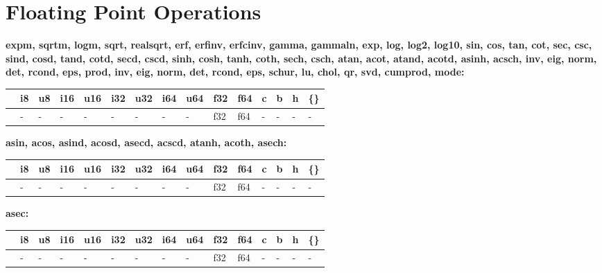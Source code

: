 \section{Floating Point Operations}
\textbf{expm, sqrtm, logm, sqrt, realsqrt, erf, erfinv, erfcinv, gamma, gammaln, exp, log, log2, log10, sin, cos, tan, cot, sec, csc, sind, cosd, tand, cotd, secd, cscd, sinh, cosh, tanh, coth, sech, csch, atan, acot, atand, acotd, asinh, acsch, inv, eig, norm, det, rcond, eps, prod, inv, eig, norm, det, rcond, eps, schur, lu, chol, qr, svd, cumprod, mode:}
\begin{scriptsize}\begin{tt}\begin{center}\vspace{-.3cm}\begin{tabular}{|m{.65cm}||m{.65cm}|m{.65cm}|m{.65cm}|m{.65cm}|m{.65cm}|m{.65cm}|m{.65cm}|m{.65cm}|m{.65cm}|m{.65cm}|m{.65cm}|m{.65cm}|m{.65cm}|m{.65cm}|}\hline 
&i8&u8&i16&u16&i32&u32&i64&u64&f32&f64&c&b&h&\{\}\\ \hline \hline
&-&-&-&-&-&-&-&-&f32&f64&-&-&-&-\\ \hline
\end{tabular}\end{center}\end{tt}\end{scriptsize} 

\textbf{asin, acos, asind, acosd, asecd, acscd, atanh, acoth, asech:}
\begin{scriptsize}\begin{tt}\begin{center}\vspace{-.3cm}\begin{tabular}{|m{.65cm}||m{.65cm}|m{.65cm}|m{.65cm}|m{.65cm}|m{.65cm}|m{.65cm}|m{.65cm}|m{.65cm}|m{.65cm}|m{.65cm}|m{.65cm}|m{.65cm}|m{.65cm}|m{.65cm}|}\hline 
&i8&u8&i16&u16&i32&u32&i64&u64&f32&f64&c&b&h&\{\}\\ \hline \hline
&-&-&-&-&-&-&-&-&f32&f64&-&-&-&-\\ \hline
\end{tabular}\end{center}\end{tt}\end{scriptsize} 

\textbf{asec:}
\begin{scriptsize}\begin{tt}\begin{center}\vspace{-.3cm}\begin{tabular}{|m{.65cm}||m{.65cm}|m{.65cm}|m{.65cm}|m{.65cm}|m{.65cm}|m{.65cm}|m{.65cm}|m{.65cm}|m{.65cm}|m{.65cm}|m{.65cm}|m{.65cm}|m{.65cm}|m{.65cm}|}\hline 
&i8&u8&i16&u16&i32&u32&i64&u64&f32&f64&c&b&h&\{\}\\ \hline \hline
&-&-&-&-&-&-&-&-&f32&f64&-&-&-&-\\ \hline
\end{tabular}\end{center}\end{tt}\end{scriptsize} 

